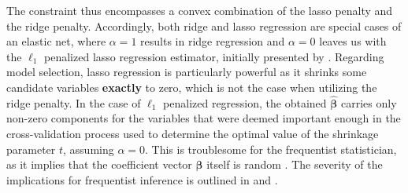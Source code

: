 \documentclass[a4paper,12pt, headsepline]{scrartcl}
\numberwithin{equation}{section}
\begin{document}
The constraint thus encompasses a convex combination of the lasso penalty and the ridge penalty. Accordingly, both ridge and lasso regression are special cases of an elastic net, where $\alpha = 1$ results in ridge regression and $\alpha = 0$ leaves us with the $\ell_1$ penalized lasso regression estimator, initially presented by \citet{tibshirani96}. Regarding model selection, lasso regression is particularly powerful as it shrinks some candidate variables \textbf{exactly} to zero, which is not the case when utilizing the ridge penalty. In the case of $\ell_1$ penalized regression, the obtained $\bm{\hat{\beta}}$ carries only non-zero components for the variables that were deemed important enough in the cross-validation process used to determine the optimal value of the shrinkage parameter $t$, assuming $\alpha = 0$. This is troublesome for the frequentist statistician, as it implies that the coefficient vector $\bm{\beta}$ itself is random \citep{Lee2016}. The severity of the implications for frequentist inference is outlined in \citet{benjamini05} and \citet{benjamini09}.
\end{document}
